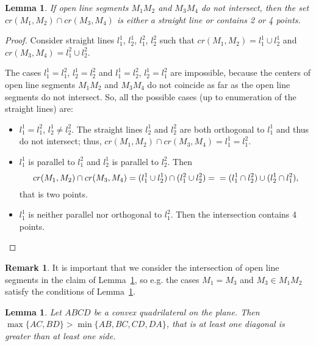 \documentclass[a4paper,14pt]{article} %
\theoremstyle{plain}
\newtheorem{lemma}[theorem]{Lemma}
\theoremstyle{definition}
\newtheorem{remark}[theorem]{Remark}
\begin{document}
\begin{lemma}
	\label{lem:intervals_cross}
	If open line segments $M_1 M_2$ and $M_3 M_4$ do not intersect,
	then the set $cr(M_1,M_2) \cap cr(M_3,M_4)$ is either a straight line or contains 2 or 4 points.
\end{lemma}

\begin{proof}
	Consider straight lines $l^1_1$, $l^1_2$, $l^2_1$, $l^2_2$
	such that $cr(M_1,M_2) = l^1_1 \cup l^1_2$ and $cr(M_3,M_4) = l^2_1 \cup l^2_2$.

	The cases $l^1_1 = l^2_1$, $l^1_2 = l^2_2$ and $l^1_1 = l^2_2$, $l^1_2 = l^2_1$ are impossible,
	because the centers of open line segments $M_1 M_2$ and $M_3 M_4$ do not coincide as far as
	the open line segments do not intersect.
	So, all the possible cases (up to enumeration of the straight lines) are:
	\begin{itemize}
		\item
			$l^1_1 = l^2_1$, $l^1_2 \neq l^2_2$.
			The straight lines $l^1_2$ and $l^2_2$ are both orthogonal to $l^1_1$ and thus do not intersect;
			thus, $cr(M_1,M_2) \cap cr(M_3,M_4) = l^1_1 = l^2_1$.
		\item
			$l^1_1$ is parallel to $l^2_1$ and $l^1_2$ is parallel to $l^2_2$.
			Then
			\begin{equation*}
				cr(M_1,M_2) \cap cr(M_3,M_4) = (l^1_1 \cup l^1_2)\cap(l^2_1 \cup l^2_2) =
				\\=
				(l^1_1 \cap l^2_2) \cup (l^1_2 \cap l^2_1)
				,
			\end{equation*}
			that is two points.
		\item
			$l^1_1$ is neither parallel nor orthogonal to $l^2_1$.
			Then the intersection contains 4 points.
	\end{itemize}
\end{proof}

\begin{remark}
	It is important that we consider the intersection of open line segments in the claim of Lemma~\ref{lem:intervals_cross},
	so e.g. the cases $M_1 = M_3$ and $M_3 \in M_1 M_2$ satisfy the conditions of Lemma~\ref{lem:intervals_cross}.
\end{remark}

\begin{lemma}
	\label{lemma:quadr_diag_edges}
	Let $ABCD$ be a convex quadrilateral on the plane.
	Then $\max\{AC,BD\}>\min\{AB,BC,CD,DA\}$,
	that is at least one diagonal is greater than at least one side.
\end{lemma}
\end{document}
